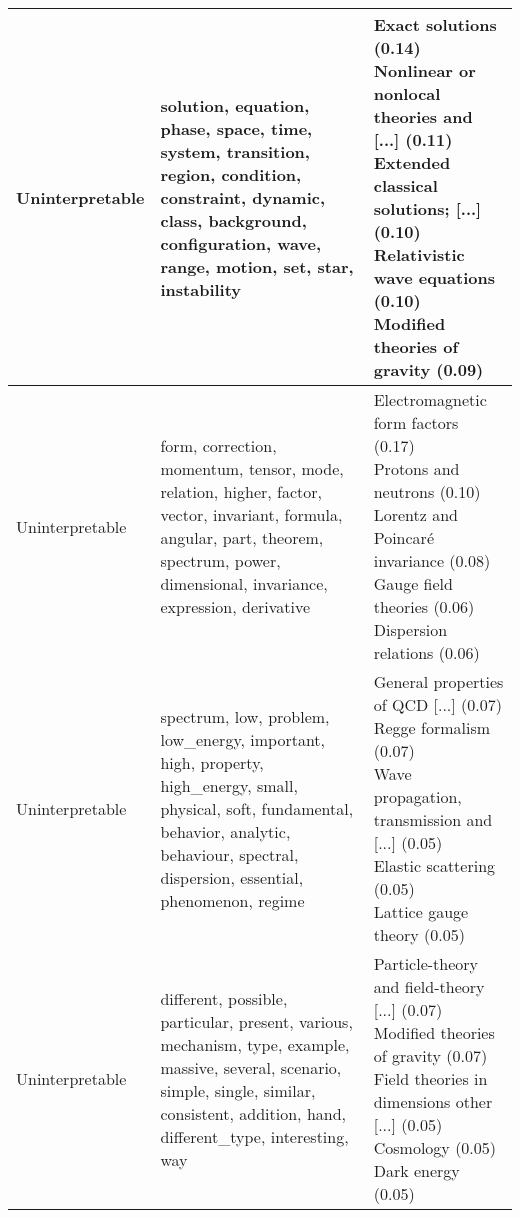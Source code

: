 \begin{longtable}{p{}|b{}|b{}}
                  Uninterpretable &                                                                        solution, equation, phase, space, time, system, transition, region, condition, constraint, dynamic, class, background, configuration, wave, range, motion, set, star, instability &                                       \shortstack[l]{Exact solutions (0.14)\\ Nonlinear or nonlocal theories and [...] (0.11)\\ Extended classical solutions; [...] (0.10)\\ Relativistic wave equations (0.10)\\ Modified theories of gravity (0.09)}\\ \hline
                  Uninterpretable &                                                                 form, correction, momentum, tensor, mode, relation, higher, factor, vector, invariant, formula, angular, part, theorem, spectrum, power, dimensional, invariance, expression, derivative &                                                                 \shortstack[l]{Electromagnetic form factors (0.17)\\ Protons and neutrons (0.10)\\ Lorentz and Poincaré invariance (0.08)\\ Gauge field theories (0.06)\\ Dispersion relations (0.06)}\\ \hline
                  Uninterpretable &                                                     spectrum, low, problem, low\_energy, important, high, property, high\_energy, small, physical, soft, fundamental, behavior, analytic, behaviour, spectral, dispersion, essential, phenomenon, regime &                                                            \shortstack[l]{General properties of QCD [...] (0.07)\\ Regge formalism (0.07)\\ Wave propagation, transmission and [...] (0.05)\\ Elastic scattering (0.05)\\ Lattice gauge theory (0.05)}\\ \hline
                  Uninterpretable &                                                          different, possible, particular, present, various, mechanism, type, example, massive, several, scenario, simple, single, similar, consistent, addition, hand, different\_type, interesting, way &                                                          \shortstack[l]{Particle-theory and field-theory [...] (0.07)\\ Modified theories of gravity (0.07)\\ Field theories in dimensions other [...] (0.05)\\ Cosmology (0.05)\\ Dark energy (0.05)}\\ \hline
\end{longtable}
